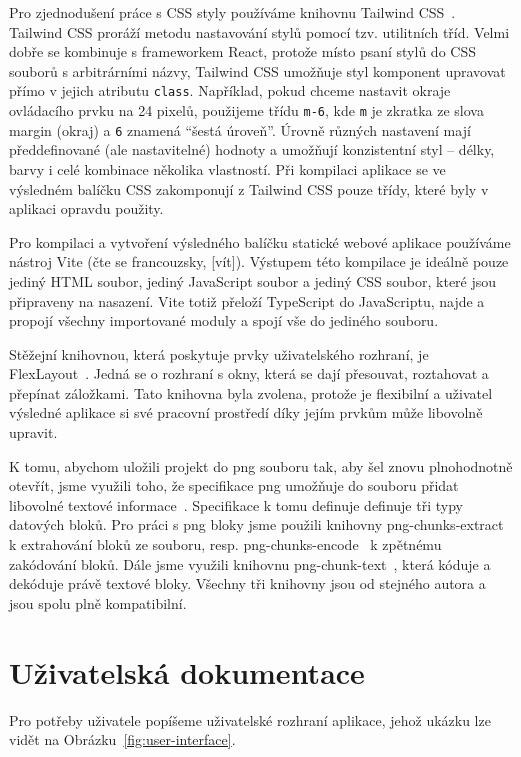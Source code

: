 Pro zjednodušení práce s CSS styly používáme knihovnu Tailwind CSS~\cite{tailwindlabs_tailwindcss_2020}.
Tailwind CSS proráží metodu nastavování stylů pomocí tzv. utilitních tříd.
Velmi dobře se kombinuje s frameworkem React, protože místo psaní stylů do CSS souborů s arbitrárními názvy, Tailwind CSS umožňuje styl komponent upravovat přímo v jejich atributu \texttt{class}.
Například, pokud chceme nastavit okraje ovládacího prvku na 24 pixelů, použijeme třídu \texttt{m-6}, kde \texttt{m} je zkratka ze slova margin (okraj) a \texttt{6} znamená \enquote{šestá úroveň}.
Úrovně různých nastavení mají předdefinované (ale nastavitelné) hodnoty a umožňují konzistentní styl -- délky, barvy i celé kombinace několika vlastností.
Při kompilaci aplikace se ve výsledném balíčku CSS zakomponují z Tailwind CSS pouze třídy, které byly v aplikaci opravdu použity.

Pro kompilaci a vytvoření výsledného balíčku statické webové aplikace používáme nástroj Vite (čte se francouzsky, [vít]).
Výstupem této kompilace je ideálně pouze jediný HTML soubor, jediný JavaScript soubor a jediný CSS soubor, které jsou připraveny na nasazení.
Vite totiž přeloží TypeScript do JavaScriptu, najde a propojí všechny importované moduly a spojí vše do jediného souboru.

Stěžejní knihovnou, která poskytuje prvky uživatelského rozhraní, je FlexLayout~\cite{_flexlayout_2015}.
Jedná se o rozhraní s okny, která se dají přesouvat, roztahovat a přepínat záložkami.
Tato knihovna byla zvolena, protože je flexibilní a uživatel výsledné aplikace si své pracovní prostředí díky jejím prvkům může libovolně upravit.

K tomu, abychom uložili projekt do \acrshort{png} souboru tak, aby šel znovu plnohodnotně otevřít, jsme využili toho, že specifikace \acrshort{png} umožňuje do souboru přidat libovolné textové informace~\cite[sekce 11.3.4]{w3c_portablenetwork_2003}.
Specifikace k tomu definuje definuje tři typy datových bloků.
Pro práci s \acrshort{png} bloky jsme použili knihovny png-chunks-extract~\cite{kennedy_pngchunksextract_2015} k extrahování bloků ze souboru, resp. png-chunks-encode~\cite{kennedy_pngchunksencode_2015} k zpětnému zakódování bloků.
Dále jsme využili knihovnu png-chunk-text~\cite{kennedy_pngchunktext_2015}, která kóduje a dekóduje právě textové bloky.
Všechny tři knihovny jsou od stejného autora a jsou spolu plně kompatibilní.

\section{Uživatelská dokumentace}
Pro potřeby uživatele popíšeme uživatelské rozhraní aplikace, jehož ukázku lze vidět na Obrázku~\ref{fig:user-interface}.

